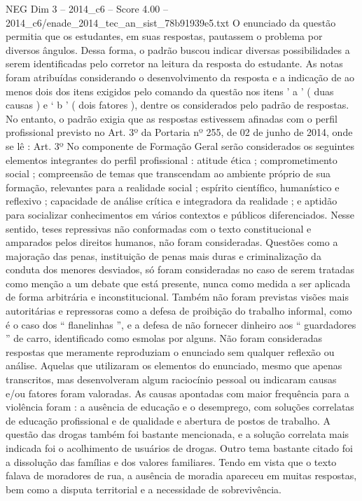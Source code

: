 \begin{textsample}{NEG Dim 3 – 2014\_c6 – Score 4.00 – 2014\_c6/enade\_2014\_tec\_an\_sist\_78b91939e5.txt}
O enunciado da questão permitia que os estudantes, em suas respostas, pautassem o problema por diversos ângulos.
Dessa forma, o padrão buscou indicar diversas possibilidades a serem identificadas pelo corretor na leitura da resposta do estudante.
As notas foram atribuídas considerando o desenvolvimento da resposta e a indicação de ao menos dois dos itens exigidos pelo comando da questão nos itens ’ a ’ ( duas causas ) e ‘ b ’ ( dois fatores ), dentre os considerados pelo padrão de respostas.
No entanto, o padrão exigia que as respostas estivessem afinadas com o perfil profissional previsto no Art. 3º da Portaria nº 255, de 02 de junho de 2014, onde se lê : Art. 3º No componente de Formação Geral serão considerados os seguintes elementos integrantes do perfil profissional : atitude ética ; comprometimento social ; compreensão de temas que transcendam ao ambiente próprio de sua formação, relevantes para a realidade social ; espírito científico, humanístico e reflexivo ; capacidade de análise crítica e integradora da realidade ; e aptidão para socializar conhecimentos em vários contextos e públicos diferenciados.
Nesse sentido, teses repressivas não conformadas com o texto constitucional e amparados pelos direitos humanos, não foram consideradas.
Questões como a majoração das penas, instituição de penas mais duras e criminalização da conduta dos menores desviados, só foram consideradas no caso de serem tratadas como menção a um debate que está presente, nunca como medida a ser aplicada de forma arbitrária e inconstitucional.
Também não foram previstas visões mais autoritárias e repressoras como a defesa de proibição do trabalho informal, como é o caso dos “ flanelinhas ”, e a defesa de não fornecer dinheiro aos “ guardadores ” de carro, identificado como esmolas por alguns.
Não foram consideradas respostas que meramente reproduziam o enunciado sem qualquer reflexão ou análise.
Aquelas que utilizaram os elementos do enunciado, mesmo que apenas transcritos, mas desenvolveram algum raciocínio pessoal ou indicaram causas e/ou fatores foram valoradas.
As causas apontadas com maior frequência para a violência foram : a ausência de educação e o desemprego, com soluções correlatas de educação profissional e de qualidade e abertura de postos de trabalho.
A questão das drogas também foi bastante mencionada, e a solução correlata mais indicada foi o acolhimento de usuários de drogas.
Outro tema bastante citado foi a dissolução das famílias e dos valores familiares.
Tendo em vista que o texto falava de moradores de rua, a ausência de moradia apareceu em muitas respostas, bem como a disputa territorial e a necessidade de sobrevivência.

\end{textsample}
